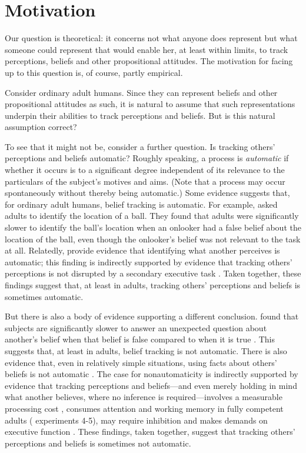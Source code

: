 \documentclass[12pt,\papersize]{extarticle}
\begin{document}
\section{Motivation}
Our question is theoretical: it concerns 
not what anyone does represent
but what someone could represent that would enable her, at least within limits, to track perceptions, beliefs and other propositional attitudes.
The motivation for facing up to this question is, of course, partly empirical.

Consider ordinary adult humans.
Since they can represent beliefs and other propositional attitudes as such, 
it is natural to assume that such representations underpin their abilities to track perceptions and beliefs.
But is this natural assumption correct?

To see that it might not be, consider a further question.
Is tracking others' perceptions and beliefs automatic?
Roughly speaking,
a process is \emph{automatic} if whether it occurs is to a significant degree independent of its relevance to the particulars of the subject's motives and aims.
(Note that a process may occur spontaneously without thereby being automatic.)  
Some evidence suggests that, for ordinary adult humans, belief tracking is automatic.
For example,
\citet{kovacs_social_2010} asked adults to identify the location of a ball.
They found that adults were significantly slower to identify the ball's location when an onlooker had a false belief about the location of the ball,
even though the onlooker's belief was not relevant to the task at all.
Relatedly, \citet{Samson:2010jm} provide evidence that identifying what another perceives is automatic;  this finding is indirectly supported by  evidence that tracking others' perceptions is not disrupted by a secondary executive task \citep{qureshi:2010_executive}.
Taken together, these findings suggest that, at least in adults, tracking others' perceptions and beliefs is sometimes automatic.

But there is also a body of evidence supporting a different conclusion.
\citet{back:2010_apperly} found that subjects are significantly slower to answer an unexpected question about another's belief when that belief is false compared to when it is true \citep[see also][]{apperly:2006_belief}.
This suggests that, at least in adults, belief tracking is not automatic.
There is also evidence that, even in relatively simple situations, 
using facts about others' beliefs is not automatic \citep{Keysar:2003xu,apperly:2010_limits}.
The case for nonautomaticity is indirectly supported by evidence that tracking perceptions and beliefs---and even merely holding in mind what another believes, where no inference is required---involves a measurable processing cost  \citep{apperly:2008_back,apperly:2010_limits}, consumes attention and working memory in fully competent adults (\citealp{en_1698, lin:2010_reflexively, en_1547} experiments 4-5), may require inhibition \citep{bull:2008_role} and makes demands on executive function \citep{apperly:2004_frontal,samson:2005_seeing}.
These findings, taken together, suggest that tracking others' perceptions and beliefs is sometimes not automatic.
\end{document}
